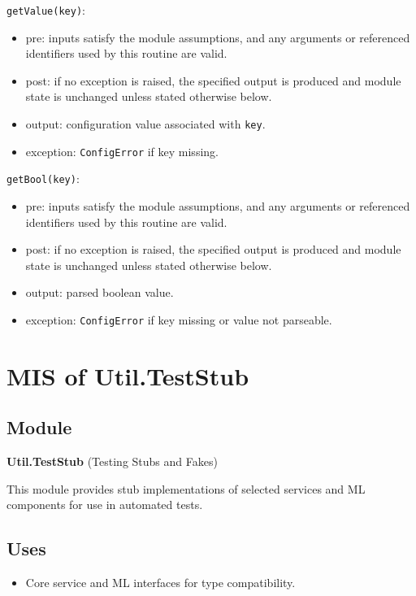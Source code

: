 \documentclass[12pt, titlepage]{article}
\begin{document}
\noindent \texttt{getValue(key)}:
\begin{itemize}
    \item pre: inputs satisfy the module assumptions, and any arguments or referenced identifiers used by this routine are valid.
    \item post: if no exception is raised, the specified output is produced and module state is unchanged unless stated otherwise below.
    \item output: configuration value associated with \texttt{key}.
    \item exception: \texttt{ConfigError} if key missing.
\end{itemize}

\noindent \texttt{getBool(key)}:
\begin{itemize}
    \item pre: inputs satisfy the module assumptions, and any arguments or referenced identifiers used by this routine are valid.
    \item post: if no exception is raised, the specified output is produced and module state is unchanged unless stated otherwise below.
    \item output: parsed boolean value.
    \item exception: \texttt{ConfigError} if key missing or value not parseable.
\end{itemize}



\section{MIS of Util.TestStub} \label{Util.TestStub}

\subsection{Module}
\textbf{Util.TestStub} \; (Testing Stubs and Fakes)

This module provides stub implementations of selected services and ML components for use in automated tests.

\subsection{Uses}
\begin{itemize}
    \item Core service and ML interfaces for type compatibility.
\end{itemize}
\end{document}
